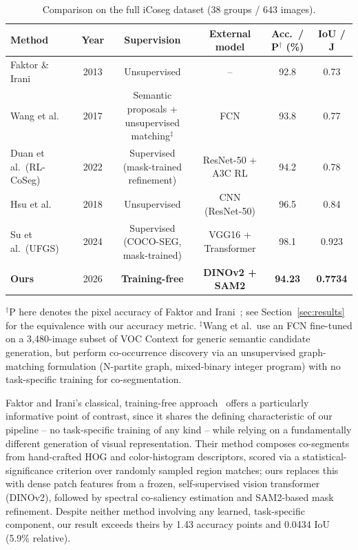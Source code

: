 \begin{table}[t]
\centering
\caption{Comparison on the full iCoseg dataset (38 groups / 643 images).}
\label{tab:icoseg38-comparison}
\begin{tabular}{lccccc}
\toprule
Method & Year & Supervision & External model & Acc.\ / P$^\dagger$ (\%) & IoU / J \\
\midrule
Faktor \& Irani~\cite{faktor2013} & 2013 & Unsupervised & -- & 92.8 & 0.73 \\
Wang et al.~\cite{wang2017nparitite} & 2017 & Semantic proposals + unsupervised matching$^\ddagger$ & FCN & 93.8 & 0.77 \\
Duan et al.\ (RL-CoSeg)~\cite{duan2022rlcoseg} & 2022 & Supervised (mask-trained refinement) & ResNet-50 + A3C RL & 94.2 & 0.78 \\
Hsu et al.~\cite{hsu2018} & 2018 & Unsupervised & CNN (ResNet-50) & 96.5 & 0.84 \\
Su et al.\ (UFGS)~\cite{su2024ufgs} & 2024 & Supervised (COCO-SEG, mask-trained) & VGG16 + Transformer & 98.1 & 0.923 \\
\textbf{Ours} & 2026 & \textbf{Training-free} & \textbf{DINOv2 + SAM2} & \textbf{94.23} & \textbf{0.7734} \\
\bottomrule
\end{tabular}
\vspace{2pt}
\footnotesize{$^\dagger$P here denotes the pixel accuracy of Faktor and Irani~\cite{faktor2013}; see Section~\ref{sec:results} for the equivalence with our accuracy metric. $^\ddagger$Wang et al.\ use an FCN fine-tuned on a 3{,}480-image subset of VOC Context for generic semantic candidate generation, but perform co-occurrence discovery via an unsupervised graph-matching formulation (N-partite graph, mixed-binary integer program) with no task-specific training for co-segmentation.}
\end{table}

Faktor and Irani's classical, training-free approach~\cite{faktor2013} offers a particularly informative point of contrast, since it shares the defining characteristic of our pipeline -- no task-specific training of any kind -- while relying on a fundamentally different generation of visual representation. Their method composes co-segments from hand-crafted HOG and color-histogram descriptors, scored via a statistical-significance criterion over randomly sampled region matches; ours replaces this with dense patch features from a frozen, self-supervised vision transformer (DINOv2), followed by spectral co-saliency estimation and SAM2-based mask refinement. Despite neither method involving any learned, task-specific component, our result exceeds theirs by 1.43 accuracy points and 0.0434 IoU (5.9\% relative).

